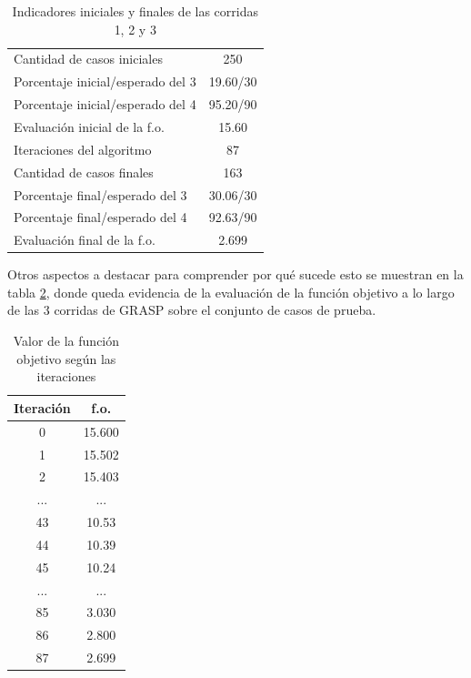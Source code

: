 \documentclass[a4paper,12pt]{book}
\begin{document}
	\begin{table}[h]
		\begin{center}
			\begin{tabular}{| l | c |} \hline
				Cantidad de casos iniciales & 250 \\
				Porcentaje inicial/esperado del 3 & 19.60/30 \\
				Porcentaje inicial/esperado del 4 & 95.20/90 \\
				Evaluación inicial de la f.o. & 15.60 \\ \hline
				Iteraciones del algoritmo & 87 \\ \hline
				Cantidad de casos finales & 163 \\
				Porcentaje final/esperado del 3 & 30.06/30 \\
				Porcentaje final/esperado del 4 & 92.63/90 \\
				Evaluación final de la f.o. & 2.699 \\ \hline
			\end{tabular}
			\caption{Indicadores iniciales y finales de las corridas 1, 2 y 3}
			\label{tab:IndicadoresGRASP123}
		\end{center}
	\end{table}

	Otros aspectos a destacar para comprender por qué sucede esto se muestran en la tabla \ref{tab:foGRASP123}, donde queda evidencia de la evaluación de la función objetivo a lo largo de las 3 corridas de GRASP sobre el conjunto de casos de prueba.
	
	\begin{table}[h]
		\begin{center}
			\begin{tabular}{| c | c |} \hline
				Iteración & f.o. \\ \hline
				0 & 15.600 \\
				1 & 15.502 \\
				2 & 15.403 \\
				... & ... \\
				43 & 10.53 \\
				44 & 10.39 \\
				45 & 10.24 \\
				... & ... \\
				85 & 3.030 \\
				86 & 2.800 \\
				87 & 2.699 \\ \hline
			\end{tabular}
			\caption{Valor de la función objetivo según las iteraciones}
			\label{tab:foGRASP123}
		\end{center}
	\end{table}
		
\end{document}
